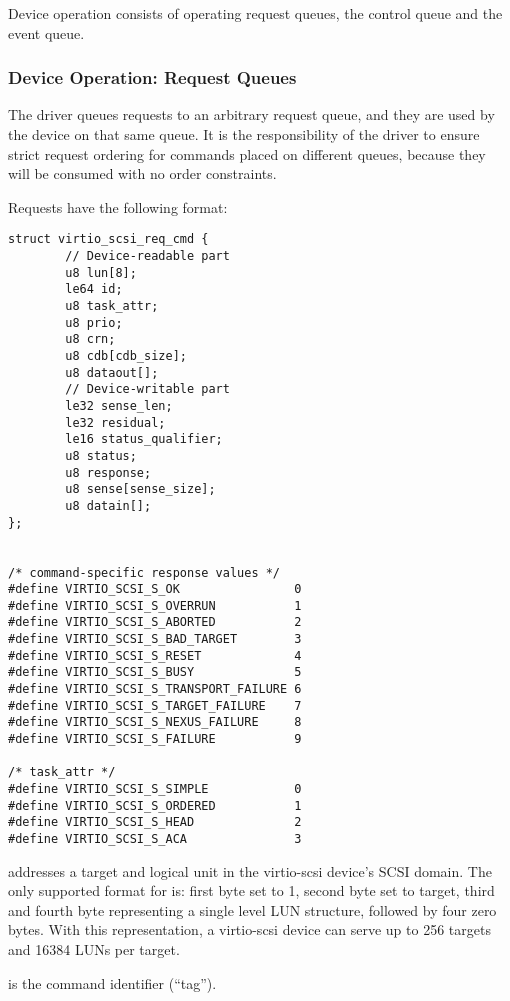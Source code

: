 Device operation consists of operating request queues, the control
queue and the event queue.

\subsubsection{Device Operation: Request Queues}\label{sec:Device Types / SCSI Host Device / Device Operation / Device Operation: Request Queues}

The driver queues requests to an arbitrary request queue, and
they are used by the device on that same queue. It is the
responsibility of the driver to ensure strict request ordering
for commands placed on different queues, because they will be
consumed with no order constraints.

Requests have the following format:

\begin{lstlisting}
struct virtio_scsi_req_cmd {
        // Device-readable part
        u8 lun[8];
        le64 id;
        u8 task_attr;
        u8 prio;
        u8 crn;
        u8 cdb[cdb_size];
        u8 dataout[];
        // Device-writable part
        le32 sense_len;
        le32 residual;
        le16 status_qualifier;
        u8 status;
        u8 response;
        u8 sense[sense_size];
        u8 datain[];
};


/* command-specific response values */
#define VIRTIO_SCSI_S_OK                0
#define VIRTIO_SCSI_S_OVERRUN           1
#define VIRTIO_SCSI_S_ABORTED           2
#define VIRTIO_SCSI_S_BAD_TARGET        3
#define VIRTIO_SCSI_S_RESET             4
#define VIRTIO_SCSI_S_BUSY              5
#define VIRTIO_SCSI_S_TRANSPORT_FAILURE 6
#define VIRTIO_SCSI_S_TARGET_FAILURE    7
#define VIRTIO_SCSI_S_NEXUS_FAILURE     8
#define VIRTIO_SCSI_S_FAILURE           9

/* task_attr */
#define VIRTIO_SCSI_S_SIMPLE            0
#define VIRTIO_SCSI_S_ORDERED           1
#define VIRTIO_SCSI_S_HEAD              2
#define VIRTIO_SCSI_S_ACA               3
\end{lstlisting}

 addresses a target and logical unit in the
virtio-scsi device's SCSI domain. The only supported format for
 is: first byte set to 1, second byte set to target,
third and fourth byte representing a single level LUN structure,
followed by four zero bytes. With this representation, a
virtio-scsi device can serve up to 256 targets and 16384 LUNs per
target.

 is the command identifier (``tag'').

